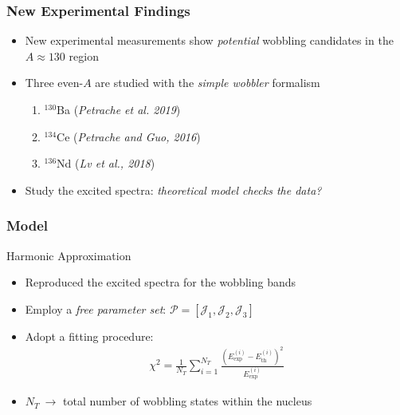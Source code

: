 \documentclass{beamer}
\begin{document}
\begin{frame}
  \frametitle{New Experimental Findings}
  \begin{itemize}
    \item New experimental measurements show \emph{potential} wobbling candidates in the $A\approx 130$ region
    \item Three even-$A$ are studied with the \emph{simple wobbler} formalism
    \begin{enumerate}
      \item $^{130}$Ba (\emph{Petrache et al. 2019})
      \item $^{134}$Ce (\emph{Petrache and Guo, 2016})
      \item $^{136}$Nd (\emph{Lv et al., 2018})
    \end{enumerate}
    \item Study the excited spectra: \emph{theoretical model checks the data?}
  \end{itemize}
\end{frame}

\begin{frame}
  \frametitle{Model}

  \begin{alertblock}{Harmonic Approximation}
    \begin{itemize}
      \item Reproduced the excited spectra for the wobbling bands
      \item Employ a \emph{free parameter set}: $\mathcal{P}=\left[\mathcal{J}_1,\mathcal{J}_2,\mathcal{J}_3\right]$
      \item Adopt a fitting procedure:
      \begin{align}
        \chi^2=\frac{1}{N_T}\sum_{i=1}^{N_T}\frac{\left(E_\text{exp}^{(i)}-E_\text{th}^{(i)}\right)^2}{E_\text{exp}^{(i)}}
      \end{align}
      \item $N_T\ \rightarrow$ total number of wobbling states within the nucleus
    \end{itemize}
  \end{alertblock}

\end{frame}
\end{document}
